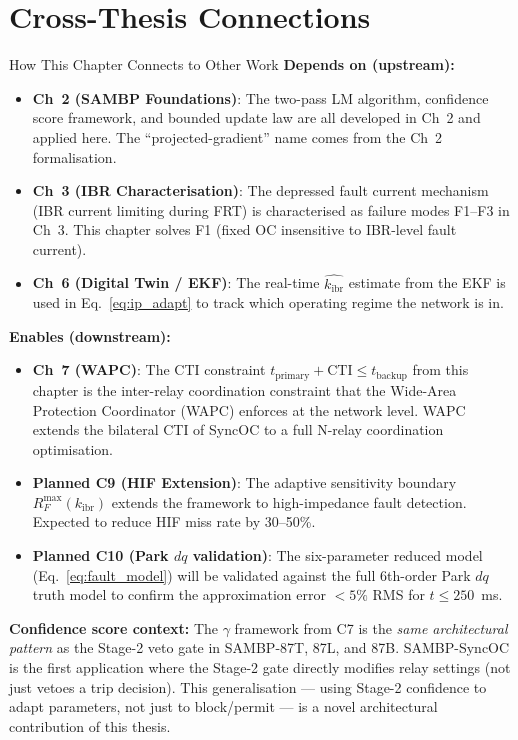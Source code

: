 \documentclass[12pt,a4paper]{article}
\newcommand{\kibr}{k_\mathrm{ibr}}
\newcommand{\tpri}{t_\mathrm{primary}}
\newcommand{\tbak}{t_\mathrm{backup}}
\newcommand{\CTI}{\mathrm{CTI}}
\begin{document}
\section{Cross-Thesis Connections}

\begin{archbox}{How This Chapter Connects to Other Work}
\textbf{Depends on (upstream):}
\begin{itemize}[nosep]
  \item \textbf{Ch~2 (SAMBP Foundations)}: The two-pass LM algorithm, confidence score framework, and bounded update law are all developed in Ch~2 and applied here. The ``projected-gradient'' name comes from the Ch~2 formalisation.
  \item \textbf{Ch~3 (IBR Characterisation)}: The depressed fault current mechanism (IBR current limiting during FRT) is characterised as failure modes F1--F3 in Ch~3. This chapter solves F1 (fixed OC insensitive to IBR-level fault current).
  \item \textbf{Ch~6 (Digital Twin / EKF)}: The real-time $\hat{\kibr}$ estimate from the EKF is used in Eq.~\eqref{eq:ip_adapt} to track which operating regime the network is in.
\end{itemize}

\textbf{Enables (downstream):}
\begin{itemize}[nosep]
  \item \textbf{Ch~7 (WAPC)}: The CTI constraint $\tpri + \CTI \leq \tbak$ from this chapter is the inter-relay coordination constraint that the Wide-Area Protection Coordinator (WAPC) enforces at the network level. WAPC extends the bilateral CTI of SyncOC to a full N-relay coordination optimisation.
  \item \textbf{Planned C9 (HIF Extension)}: The adaptive sensitivity boundary $R_F^\mathrm{max}(\kibr)$ extends the framework to high-impedance fault detection. Expected to reduce HIF miss rate by 30--50\%.
  \item \textbf{Planned C10 (Park $dq$ validation)}: The six-parameter reduced model (Eq.~\eqref{eq:fault_model}) will be validated against the full 6th-order Park $dq$ truth model to confirm the approximation error $< 5\%$ RMS for $t \leq 250$~ms.
\end{itemize}

\textbf{Confidence score context:} The $\gamma$ framework from C7 is the \emph{same architectural pattern} as the Stage-2 veto gate in SAMBP-87T, 87L, and 87B. SAMBP-SyncOC is the first application where the Stage-2 gate directly modifies relay settings (not just vetoes a trip decision). This generalisation --- using Stage-2 confidence to adapt parameters, not just to block/permit --- is a novel architectural contribution of this thesis.
\end{archbox}
\end{document}
